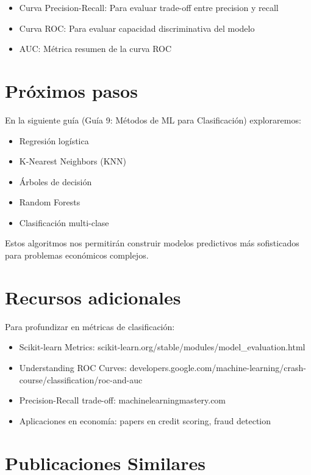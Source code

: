 \documentclass[
  doc,
  floatsintext,
  longtable,
  a4paper,
  nolmodern,
  notxfonts,
  notimes,
  12pt,
  colorlinks=true,linkcolor=blue,citecolor=blue,urlcolor=blue]{apa7}
\providecommand{\tightlist}{%
  \setlength{\itemsep}{0pt}\setlength{\parskip}{0pt}}
\begin{document}
\begin{itemize}
\tightlist
\item
  Curva Precision-Recall: Para evaluar trade-off entre precision y
  recall
\item
  Curva ROC: Para evaluar capacidad discriminativa del modelo
\item
  AUC: Métrica resumen de la curva ROC
\end{itemize}

\section{Próximos pasos}\label{pruxf3ximos-pasos}

En la siguiente guía (Guía 9: Métodos de ML para Clasificación)
exploraremos:

\begin{itemize}
\tightlist
\item
  Regresión logística
\item
  K-Nearest Neighbors (KNN)
\item
  Árboles de decisión
\item
  Random Forests
\item
  Clasificación multi-clase
\end{itemize}

Estos algoritmos nos permitirán construir modelos predictivos más
sofisticados para problemas económicos complejos.

\section{Recursos adicionales}\label{recursos-adicionales}

Para profundizar en métricas de clasificación:

\begin{itemize}
\tightlist
\item
  Scikit-learn Metrics:
  scikit-learn.org/stable/modules/model\_evaluation.html
\item
  Understanding ROC Curves:
  developers.google.com/machine-learning/crash-course/classification/roc-and-auc
\item
  Precision-Recall trade-off: machinelearningmastery.com
\item
  Aplicaciones en economía: papers en credit scoring, fraud detection
\end{itemize}

\section{Publicaciones Similares}\label{publicaciones-similares}
\end{document}
